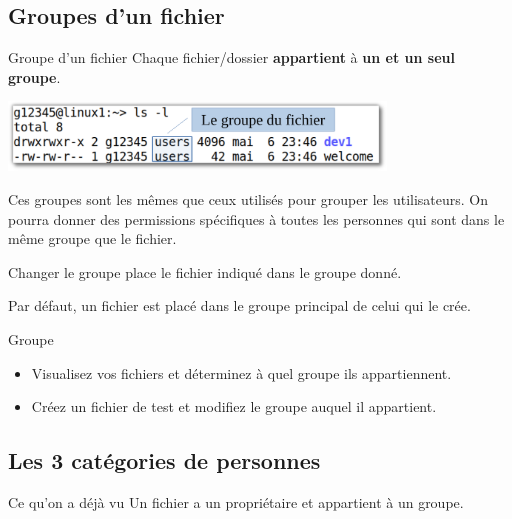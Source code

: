 \documentclass[a4paper,11pt]{style-esi/td}
\begin{document}
	\subsection{Groupes d'un fichier}

		\begin{theorie}{Groupe d'un fichier}
			Chaque fichier/dossier \textbf{appartient} à \textbf{un et un seul groupe}.
		\end{theorie}

		\begin{center}
			\includegraphics[height=5em]{image/group}
		\end{center}

		Ces groupes sont les mêmes que ceux utilisés pour grouper les utilisateurs.
		On pourra donner des permissions spécifiques à toutes les personnes
		qui sont dans le même groupe que le fichier.

		\begin{theorie}{Changer le groupe}
			place le fichier indiqué dans le groupe donné.
		\end{theorie}

		Par défaut, un fichier est placé dans le groupe principal de celui qui le crée.

		\begin{Exercice}{Groupe}
			\vspace{-1em}
			\begin{itemize}
			\item Visualisez vos fichiers et déterminez à quel groupe ils appartiennent.
			\item Créez un fichier de test et modifiez le groupe auquel il appartient.
			\end{itemize}
		\end{Exercice}

	\subsection{Les 3 catégories de personnes}

		\begin{infotbox}{Ce qu'on a déjà vu}
			Un fichier a un propriétaire et appartient à un groupe.
		\end{infotbox}
\end{document}
